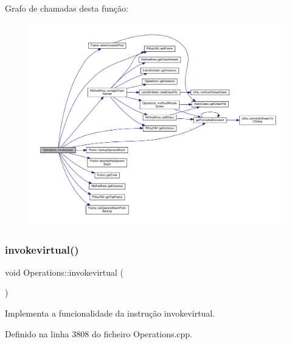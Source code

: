 Grafo de chamadas desta função\+:
\nopagebreak
\begin{figure}[H]
\begin{center}
\leavevmode
\includegraphics[width=350pt]{classOperations_a562d8c9cc5975de2ee6d1a95e1969724_cgraph}
\end{center}
\end{figure}
\mbox{\label{classOperations_acf53d7e184b8828702b4d5036ef0a7a9}} 
\subsubsection{\texorpdfstring{invokevirtual()}{invokevirtual()}}
{\footnotesize\ttfamily void Operations\+::invokevirtual (\begin{DoxyParamCaption}{ }\end{DoxyParamCaption})\hspace{0.3cm}{\ttfamily [private]}}



Implementa a funcionalidade da instrução invokevirtual. 



Definido na linha 3808 do ficheiro Operations.\+cpp.



